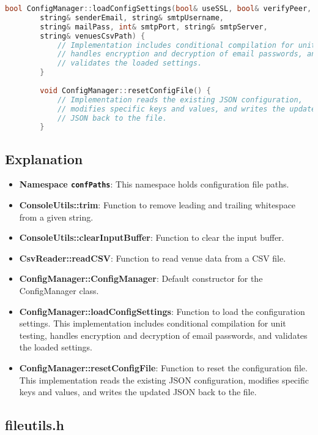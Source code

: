 \documentclass{article}
\begin{document}
\begin{mdframed}[backgroundcolor=background, hidealllines=false, innerleftmargin=15pt, innerrightmargin=5pt, innertopmargin=0pt, innerbottommargin=-5pt, linecolor=accent]
\begin{lstlisting}[language=C++]
		bool ConfigManager::loadConfigSettings(bool& useSSL, bool& verifyPeer, bool& verifyHost, bool& verbose, 
		string& senderEmail, string& smtpUsername, 
		string& mailPass, int& smtpPort, string& smtpServer, 
		string& venuesCsvPath) {
			// Implementation includes conditional compilation for unit testing, 
			// handles encryption and decryption of email passwords, and 
			// validates the loaded settings.
		}
		
		void ConfigManager::resetConfigFile() {
			// Implementation reads the existing JSON configuration, 
			// modifies specific keys and values, and writes the updated 
			// JSON back to the file.
		}
	\end{lstlisting}
\end{mdframed}
	
	\subsection*{Explanation}
	\begin{itemize}
		\item \textbf{Namespace \texttt{confPaths}}: This namespace holds configuration file paths.
		\item \textbf{ConsoleUtils::trim}: Function to remove leading and trailing whitespace from a given string.
		\item \textbf{ConsoleUtils::clearInputBuffer}: Function to clear the input buffer.
		\item \textbf{CsvReader::readCSV}: Function to read venue data from a CSV file.
		\item \textbf{ConfigManager::ConfigManager}: Default constructor for the ConfigManager class.
		\item \textbf{ConfigManager::loadConfigSettings}: Function to load the configuration settings. This implementation includes conditional compilation for unit testing, handles encryption and decryption of email passwords, and validates the loaded settings.
		\item \textbf{ConfigManager::resetConfigFile}: Function to reset the configuration file. This implementation reads the existing JSON configuration, modifies specific keys and values, and writes the updated JSON back to the file.
	\end{itemize}
	
	\subsection{fileutils.h}
	
\end{document}

